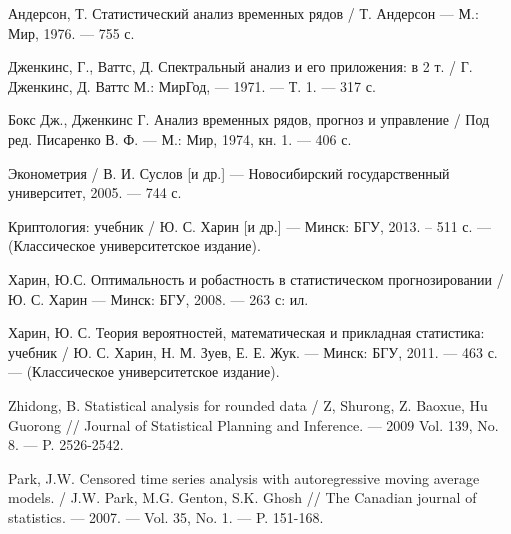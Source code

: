 \begin{thebibliography}{9}
    Андерсон, Т. Статистический анализ временных рядов / Т. Андерсон --- М.: Мир, 1976. --- 755 с.

    Дженкинс, Г., Ваттс, Д. Спектральный анализ и его приложения: в 2 т. / Г. Дженкинс, Д. Ваттс М.: МирГод, --- 1971. --- Т. 1. --- 317 с.

    Бокс Дж., Дженкинс Г. Анализ временных рядов, прогноз и управление / Под ред. Писаренко В. Ф. --- М.: Мир, 1974, кн. 1. --- 406 с. 

    Эконометрия / В. И. Суслов [и др.] --- Новосибирский государственный университет, 2005. --- 744 с.

    Криптология: учебник / Ю. С. Харин [и др.] --- Минск: БГУ, 2013. – 511 с. --- (Классическое университетское издание).

    Харин, Ю.С. Оптимальность и робастность в статистическом прогнозировании / Ю. С. Харин --- Минск: БГУ, 2008. --- 263 с: ил.

    Харин, Ю. С. Теория вероятностей, математическая и прикладная статистика: учебник / Ю. С. Харин, Н. М. Зуев, Е. Е. Жук. --- Минск: БГУ, 2011. --- 463 с. --- (Классическое университетское издание).

    Zhidong, B. Statistical analysis for rounded data / Z, Shurong, Z. Baoxue, Hu Guorong // Journal of Statistical Planning and Inference. --- 2009 Vol. 139, No. 8. --- P. 2526-2542.

    Park, J.W. Censored time series analysis with autoregressive moving average models. / J.W. Park, M.G. Genton, S.K. Ghosh // The Canadian journal of statistics. --- 2007.  --- Vol. 35, No. 1. --- P. 151-168.
\end{thebibliography}